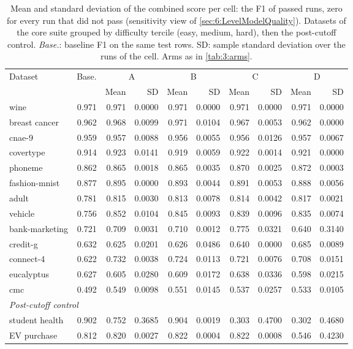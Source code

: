 \begin{table}[htbp]
  \centering
  \small
  \caption[Mean and SD of F1 per cell, combined score]{Mean and standard deviation of the combined score per cell: the F1 of passed runs, zero for every run that did not pass (sensitivity view of \autoref{sec:6:LevelModelQuality}). Datasets of the core suite grouped by difficulty tercile (easy, medium, hard), then the post-cutoff control. \emph{Base.}: baseline F1 on the same test rows. SD: sample standard deviation over the runs of the cell. Arms as in \autoref{tab:3:arms}.}
  \label{tab:D:combined}
  \begin{tabular}{lrrrrrrrrr}
    \toprule
    Dataset & Base. & \multicolumn{2}{c}{A} & \multicolumn{2}{c}{B} & \multicolumn{2}{c}{C} & \multicolumn{2}{c}{D} \\
    \cmidrule(lr){3-4}\cmidrule(lr){5-6}\cmidrule(lr){7-8}\cmidrule(lr){9-10}
     & & Mean & SD & Mean & SD & Mean & SD & Mean & SD \\
    \midrule
    wine & 0.971 & 0.971 & 0.0000 & 0.971 & 0.0000 & 0.971 & 0.0000 & 0.971 & 0.0000 \\
    breast cancer & 0.962 & 0.968 & 0.0099 & 0.971 & 0.0104 & 0.967 & 0.0053 & 0.962 & 0.0000 \\
    cnae-9 & 0.959 & 0.957 & 0.0088 & 0.956 & 0.0055 & 0.956 & 0.0126 & 0.957 & 0.0067 \\
    covertype & 0.914 & 0.923 & 0.0141 & 0.919 & 0.0059 & 0.922 & 0.0014 & 0.921 & 0.0000 \\
    \addlinespace
    phoneme & 0.862 & 0.865 & 0.0018 & 0.865 & 0.0035 & 0.870 & 0.0025 & 0.872 & 0.0003 \\
    fashion-mnist & 0.877 & 0.895 & 0.0000 & 0.893 & 0.0044 & 0.891 & 0.0053 & 0.888 & 0.0056 \\
    adult & 0.781 & 0.815 & 0.0030 & 0.813 & 0.0078 & 0.814 & 0.0042 & 0.817 & 0.0021 \\
    vehicle & 0.756 & 0.852 & 0.0104 & 0.845 & 0.0093 & 0.839 & 0.0096 & 0.835 & 0.0074 \\
    \addlinespace
    bank-marketing & 0.721 & 0.709 & 0.0031 & 0.710 & 0.0012 & 0.775 & 0.0321 & 0.640 & 0.3140 \\
    credit-g & 0.632 & 0.625 & 0.0201 & 0.626 & 0.0486 & 0.640 & 0.0000 & 0.685 & 0.0089 \\
    connect-4 & 0.622 & 0.732 & 0.0038 & 0.724 & 0.0113 & 0.721 & 0.0076 & 0.708 & 0.0151 \\
    eucalyptus & 0.627 & 0.605 & 0.0280 & 0.609 & 0.0172 & 0.638 & 0.0336 & 0.598 & 0.0215 \\
    cmc & 0.492 & 0.549 & 0.0098 & 0.551 & 0.0145 & 0.537 & 0.0257 & 0.533 & 0.0105 \\
    \midrule
    \multicolumn{10}{l}{\emph{Post-cutoff control}} \\
    student health & 0.902 & 0.752 & 0.3685 & 0.904 & 0.0019 & 0.303 & 0.4700 & 0.302 & 0.4680 \\
    EV purchase & 0.812 & 0.820 & 0.0027 & 0.822 & 0.0004 & 0.822 & 0.0008 & 0.546 & 0.4230 \\
    \bottomrule
  \end{tabular}
\end{table}
